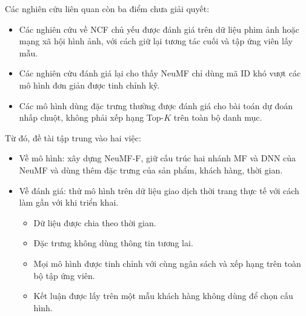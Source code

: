 Các nghiên cứu liên quan còn ba điểm chưa giải quyết:
\begin{itemize}
    \item Các nghiên cứu về NCF chủ yếu được đánh giá trên dữ liệu phim ảnh hoặc mạng xã hội hình ảnh, với cách giữ lại tương tác cuối và tập ứng viên lấy mẫu.
    \item Các nghiên cứu đánh giá lại cho thấy NeuMF chỉ dùng mã ID khó vượt các mô hình đơn giản được tinh chỉnh kỹ.
    \item Các mô hình dùng đặc trưng thường được đánh giá cho bài toán dự đoán nhấp chuột, không phải xếp hạng Top-$K$ trên toàn bộ danh mục.
\end{itemize}

Từ đó, đề tài tập trung vào hai việc:
\begin{itemize}
    \item Về mô hình: xây dựng NeuMF-F, giữ cấu trúc hai nhánh MF và DNN của NeuMF và dùng thêm đặc trưng của sản phẩm, khách hàng, thời gian.
    \item Về đánh giá: thử mô hình trên dữ liệu giao dịch thời trang thực tế với cách làm gần với khi triển khai.
    \begin{itemize}
        \item Dữ liệu được chia theo thời gian.
        \item Đặc trưng không dùng thông tin tương lai.
        \item Mọi mô hình được tinh chỉnh với cùng ngân sách và xếp hạng trên toàn bộ tập ứng viên.
        \item Kết luận được lấy trên một mẫu khách hàng không dùng để chọn cấu hình.
    \end{itemize}
\end{itemize}

\FloatBarrier
